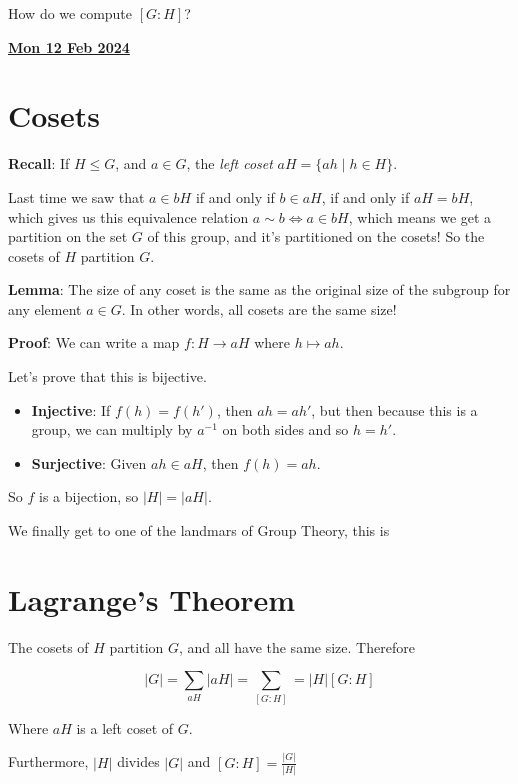 \documentclass[12pt]{article}
\renewcommand{\date}[1]{\underline{\bf #1}}
\begin{document}
\QUESTION {} How do we compute $[G : H]$?

\date{Mon 12 Feb 2024}


\section{Cosets}

{\bf Recall}: If $H \le G$, and $a \in G$, the {\it left coset} $aH = \{ah \mid
h \in H \}$.

Last time we saw that $a \in bH$ if and only if $b \in aH$, if and only if $aH =
bH$, which gives us this equivalence relation $a \sim b \Leftrightarrow a \in
bH$, which means we get a partition on the set $G$ of this group, and it's
partitioned on the cosets! So the cosets of $H$ partition $G$.

{\bf Lemma}: The size of any coset is the same as the original size of the
subgroup for any element $a \in G$. In other words, all cosets are the same
size!

{\bf Proof}: We can write a map $f: H \to aH$ where $h \mapsto ah$.

Let's prove that this is bijective.

\begin{itemize}
  \item {\bf Injective}: If $f(h) = f(h')$, then $ah = ah'$, but then because
    this is a group, we can multiply by $a^{-1}$ on both sides and so $h = h'$.

  \item {\bf Surjective}: Given $ah \in aH$, then $f(h) = ah$.
\end{itemize}

So $f$ is a bijection, so $|H| = |aH|$.


We finally get to one of the landmars of Group Theory, this is


\section{Lagrange's Theorem}
{
  The cosets of $H$ partition $G$, and all have the same size. Therefore

  \[
    |G| = \sum_{aH} |aH| = \sum_{[G : H]} = |H| [G : H]
  \]

  Where $aH$ is a left coset of $G$.

  Furthermore, $|H|$ divides $|G|$ and $[G : H] = \frac{|G|}{|H|}$
}
\end{document}
